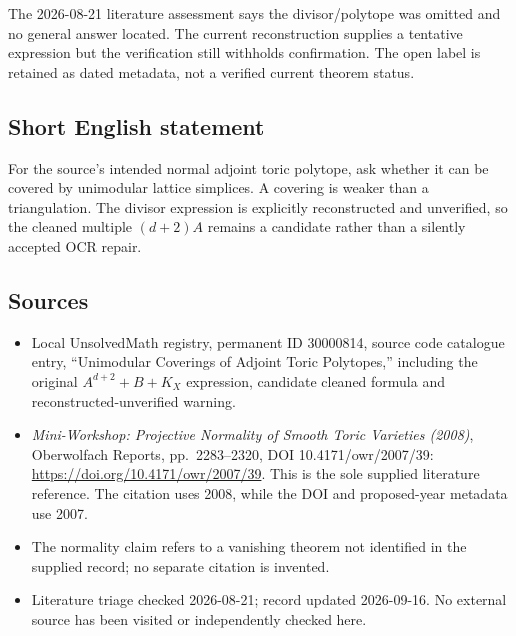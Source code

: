 \documentclass[11pt]{article}
\begin{document}
The 2026-08-21 literature assessment says the divisor/polytope was omitted and no general answer located. The current reconstruction supplies a tentative expression but the verification still withholds confirmation. The open label is retained as dated metadata, not a verified current theorem status.
\subsection{Short English statement}
For the source's intended normal adjoint toric polytope, ask whether it can be covered by unimodular lattice simplices. A covering is weaker than a triangulation. The divisor expression is explicitly reconstructed and unverified, so the cleaned multiple \((d+2)A\) remains a candidate rather than a silently accepted OCR repair.
\subsection{Sources}
\begin{itemize}
\item Local UnsolvedMath registry, permanent ID 30000814, source code catalogue entry, ``Unimodular Coverings of Adjoint Toric Polytopes,'' including the original \(A^{d+2}+B+K_X\) expression, candidate cleaned formula and reconstructed-unverified warning.
\item \emph{Mini-Workshop: Projective Normality of Smooth Toric Varieties (2008)}, Oberwolfach Reports, pp.\ 2283--2320, DOI 10.4171/owr/2007/39: \url{https://doi.org/10.4171/owr/2007/39}. This is the sole supplied literature reference. The citation uses 2008, while the DOI and proposed-year metadata use 2007.
\item The normality claim refers to a vanishing theorem not identified in the supplied record; no separate citation is invented.
\item Literature triage checked 2026-08-21; record updated 2026-09-16. No external source has been visited or independently checked here.
\end{itemize}
\end{document}
